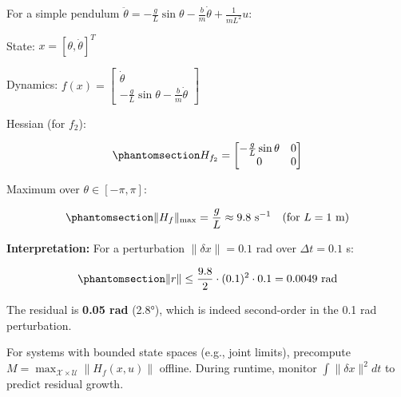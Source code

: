 \documentclass[
  letterpaper,
  DIV=11,
  numbers=noendperiod]{scrartcl}
\begin{document}
For a simple pendulum
\(\ddot{\theta} = -\frac{g}{L} \sin\theta - \frac{b}{m} \dot{\theta} + \frac{1}{mL^2} u\):

State: \(x = [\theta, \dot{\theta}]^T\)

Dynamics:
\(f(x) = \begin{bmatrix} \dot{\theta} \\ -\frac{g}{L} \sin\theta - \frac{b}{m} \dot{\theta} \end{bmatrix}\)

Hessian (for \(f_2\)):

\begin{equation}\phantomsection\label{eq-pendulum-hessian}{
H_{f_2} = \begin{bmatrix}
-\frac{g}{L} \sin\theta & 0 \\
0 & 0
\end{bmatrix}
}\end{equation}

Maximum over \(\theta \in [-\pi, \pi]\):

\begin{equation}\phantomsection\label{eq-pendulum-bound}{
\|H_f\|_{\max} = \frac{g}{L} \approx 9.8 \text{ s}^{-1} \quad \text{(for } L = 1 \text{ m)}
}\end{equation}

\textbf{Interpretation:} For a perturbation \(\|\delta x\| = 0.1\) rad
over \(\Delta t = 0.1\) s:

\begin{equation}\phantomsection\label{eq-residual-example}{
\|r\| \leq \frac{9.8}{2} \cdot (0.1)^2 \cdot 0.1 = 0.0049 \text{ rad}
}\end{equation}

The residual is \textbf{0.05 rad} (2.8°), which is indeed second-order
in the 0.1 rad perturbation.

\begin{tcolorbox}[enhanced jigsaw, breakable, bottomtitle=1mm, title=\textcolor{quarto-callout-tip-color}{\faLightbulb}\hspace{0.5em}{Practical Guideline}, opacityback=0, left=2mm, titlerule=0mm, colframe=quarto-callout-tip-color-frame, opacitybacktitle=0.6, bottomrule=.15mm, toptitle=1mm, toprule=.15mm, arc=.35mm, leftrule=.75mm, rightrule=.15mm, colback=white, colbacktitle=quarto-callout-tip-color!10!white, coltitle=black]

For systems with bounded state spaces (e.g., joint limits), precompute
\(M = \max_{\mathcal{X} \times \mathcal{U}} \|H_f(x,u)\|\) offline.
During runtime, monitor \(\int \|\delta x\|^2 dt\) to predict residual
growth.

\end{tcolorbox}
\end{document}
